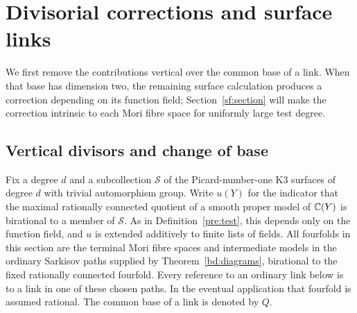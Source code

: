 \section{Divisorial corrections and surface links}
\label{sl:section}

We first remove the contributions vertical over the common base of a link.
When that base has dimension two, the remaining surface calculation
produces a correction depending on its function field;
Section~\ref{sf:section} will make the correction intrinsic to each
Mori fibre space for uniformly large test degree.

\subsection{Vertical divisors and change of base}

Fix a degree $d$ and a subcollection $\mathcal S$ of the Picard-number-one
K3 surfaces of degree $d$ with trivial automorphism group.  Write $u(Y)$ for
the indicator that the maximal rationally connected quotient of a smooth
proper model of $\mathbb C(Y)$ is birational to a member of $\mathcal S$.
As in Definition~\ref{pre:test}, this depends only on the function
field, and $u$ is extended additively to finite lists of fields.  All
fourfolds in this section are the terminal Mori fibre spaces and
intermediate models in the ordinary Sarkisov paths supplied by
Theorem~\ref{bd:diagrams}, birational to the fixed rationally connected
fourfold.  Every reference to an ordinary link below is to a link in
one of these chosen paths.  In the eventual application that
fourfold is assumed rational.  The common base of a link is denoted by
$Q$.

